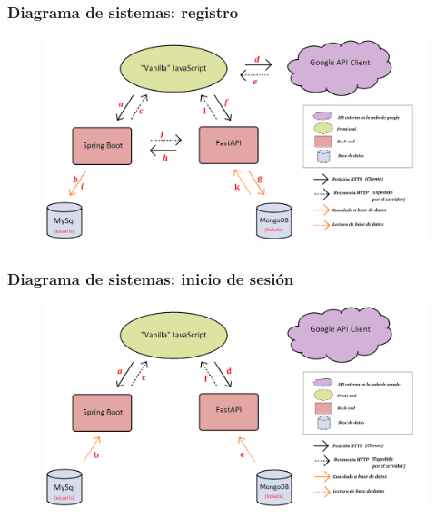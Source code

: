 \documentclass{beamer}
\begin{document}
	
	\begin{frame}
		\frametitle{Diagrama de sistemas: registro}
		
		\begin{figure}
			\centering
			\includegraphics[width=1\linewidth]{../img/diagramaSistemesAplicacioMercappCAMIREGISTREbo}
			
			\label{fig:diagramasistemesaplicaciomercappcamiregistrebo}
		\end{figure}
		
	\end{frame}
	
	
	\begin{frame}
		\frametitle{Diagrama de sistemas: inicio de sesión}
		
		\begin{figure}
			\centering
			\includegraphics[width=1\linewidth]{../img/diagramaSistemesAplicacioMercappCAMIINICISESSIO}
			
			\label{fig:diagramasistemesaplicaciomercappcamiinicisessio}
		\end{figure}
		
	\end{frame}
	
\end{document}
